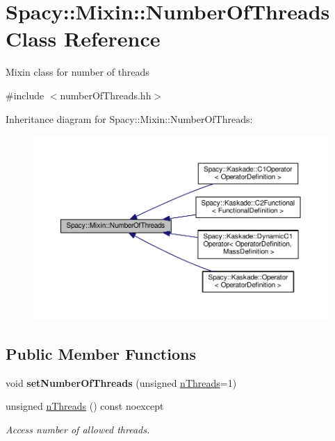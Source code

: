 \hypertarget{classSpacy_1_1Mixin_1_1NumberOfThreads}{}\section{Spacy\+:\+:Mixin\+:\+:Number\+Of\+Threads Class Reference}
\label{classSpacy_1_1Mixin_1_1NumberOfThreads}


Mixin class for number of threads  




{\ttfamily \#include $<$number\+Of\+Threads.\+hh$>$}



Inheritance diagram for Spacy\+:\+:Mixin\+:\+:Number\+Of\+Threads\+:\nopagebreak
\begin{figure}[H]
\begin{center}
\leavevmode
\includegraphics[width=350pt]{classSpacy_1_1Mixin_1_1NumberOfThreads__inherit__graph}
\end{center}
\end{figure}
\subsection*{Public Member Functions}
\begin{DoxyCompactItemize}
\item 
\hypertarget{classSpacy_1_1Mixin_1_1NumberOfThreads_ab0c2fca77cb0d613e3bb8ce5bda11fdc}{}void {\bfseries set\+Number\+Of\+Threads} (unsigned \hyperlink{classSpacy_1_1Mixin_1_1NumberOfThreads_a385963b95b5e1ddf422393146cc71ee1}{n\+Threads}=1)\label{classSpacy_1_1Mixin_1_1NumberOfThreads_ab0c2fca77cb0d613e3bb8ce5bda11fdc}

\item 
\hypertarget{classSpacy_1_1Mixin_1_1NumberOfThreads_a385963b95b5e1ddf422393146cc71ee1}{}unsigned \hyperlink{classSpacy_1_1Mixin_1_1NumberOfThreads_a385963b95b5e1ddf422393146cc71ee1}{n\+Threads} () const noexcept\label{classSpacy_1_1Mixin_1_1NumberOfThreads_a385963b95b5e1ddf422393146cc71ee1}

\begin{DoxyCompactList}\small\item\em Access number of allowed threads. \end{DoxyCompactList}\end{DoxyCompactItemize}


